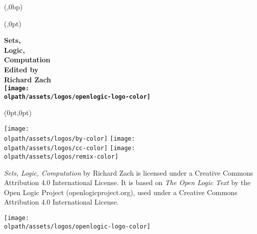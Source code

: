 \documentclass{memoir}
\newcommand{\olpath}{../../../}
\newlength{\coverheight}
\newlength{\spinewidth}
\newlength{\spinepos} %
\newlength{\coverpos} %
\begin{document}
\pagestyle{empty}


\pagecolor{OLPiceblue}


\begin{textblock*}{\spinewidth}(\spinepos,0bp)%
\noindent\hfil{}\hfil
\end{textblock*}


\newbox\adjust
\begin{textblock*}{\spinepos}(\coverpos,0pt)
  \noindent\hfil
  \begin{minipage}[b][\coverheight][s]{.8\spinepos}
    \vfil
      \begin{raggedleft}
        \fontsize{48pt}{7em}\selectfont\bfseries\sffamily
        \setbox\adjust\hbox{\phantom{,}}
        Sets,\\ Logic,\\ Computation\usebox\adjust\\
      \vfil
      \normalfont\Huge
      \textbf{Edited by\usebox\adjust\\ Richard Zach}\usebox\adjust\\
      \vfil
      \texttt{[image: \\olpath/assets/logos/openlogic-logo-color]}%
\usebox\adjust\\
      \vspace*{1cm}
      \end{raggedleft}
  \end{minipage}
  \hfil
  \end{textblock*}

\begin{textblock*}{\spinepos}(0pt,0pt)
  \noindent\hfil
  \begin{minipage}[b][\coverheight][c]{.8\spinepos}
\begin{minipage}[b]{.9cm}
\texttt{[image: \\olpath/assets/logos/by-color]}
\texttt{[image: \\olpath/assets/logos/cc-color]}
\texttt{[image: \\olpath/assets/logos/remix-color]}
\end{minipage}
\hspace{.3cm}
\begin{minipage}[b]{5cm}
\sffamily\fontsize{8.5pt}{1em}\selectfont\textit{Sets, Logic, Computation}
by Richard Zach is licensed under a Creative Commons Attribution 4.0
International License. It is based on \textit{The Open Logic Text} by
the Open Logic Project (openlogicproject.org), used under a Creative
Commons Attribution 4.0 International License.
\end{minipage}
\hfill\color{OLPreflexblue}
\texttt{[image: \\olpath/assets/logos/openlogic-logo-color]}
\vspace*{1cm}
  \end{minipage}
  \hfil
  \end{textblock*}
\end{document}
